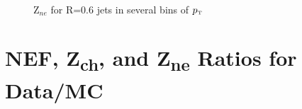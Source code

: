 \documentclass[ALICE]{ALICE_analysis_notes}
\newcommand{\pT}{$p_{\mbox{\tiny T}}$\xspace}
\begin{document}
\begin{appendix}
\begin{figure}[h!]
    \\
    \caption{Z$_{ne}$ for R=0.6 jets in several bins of \pT}
    \label{fig:TriggerBiasZneR06}
\end{figure}

\newpage

\section{NEF, \texorpdfstring{Z\textsubscript{ch}}{Zch}, and \texorpdfstring{Z\textsubscript{ne}}{Zne} Ratios for Data/MC}
\label{sec:appendixTriggerBiasRatios}



\end{appendix}
\end{document}
